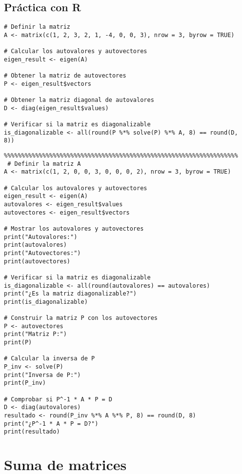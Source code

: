 \subsection{Práctica con R}
\begin{verbatim}
# Definir la matriz
A <- matrix(c(1, 2, 3, 2, 1, -4, 0, 0, 3), nrow = 3, byrow = TRUE)

# Calcular los autovalores y autovectores
eigen_result <- eigen(A)

# Obtener la matriz de autovectores
P <- eigen_result$vectors

# Obtener la matriz diagonal de autovalores
D <- diag(eigen_result$values)

# Verificar si la matriz es diagonalizable
is_diagonalizable <- all(round(P %*% solve(P) %*% A, 8) == round(D, 8))    
\end{verbatim}
\begin{verbatim}
%%%%%%%%%%%%%%%%%%%%%%%%%%%%%%%%%%%%%%%%%%%%%%%%%%%%%%%%%%%%%%%%%%%
 # Definir la matriz A
A <- matrix(c(1, 2, 0, 0, 3, 0, 0, 0, 2), nrow = 3, byrow = TRUE)

# Calcular los autovalores y autovectores
eigen_result <- eigen(A)
autovalores <- eigen_result$values
autovectores <- eigen_result$vectors

# Mostrar los autovalores y autovectores
print("Autovalores:")
print(autovalores)
print("Autovectores:")
print(autovectores)

# Verificar si la matriz es diagonalizable
is_diagonalizable <- all(round(autovalores) == autovalores)
print("¿Es la matriz diagonalizable?")
print(is_diagonalizable)

# Construir la matriz P con los autovectores
P <- autovectores
print("Matriz P:")
print(P)

# Calcular la inversa de P
P_inv <- solve(P)
print("Inversa de P:")
print(P_inv)

# Comprobar si P^-1 * A * P = D
D <- diag(autovalores)
resultado <- round(P_inv %*% A %*% P, 8) == round(D, 8)
print("¿P^-1 * A * P = D?")
print(resultado)   
\end{verbatim}


\section{Suma de matrices} 

